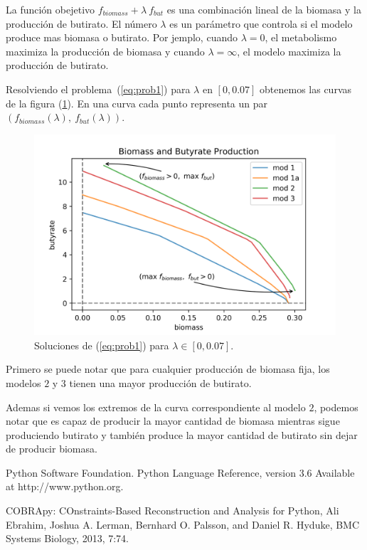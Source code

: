 \documentclass[12pt,spanish]{article}
\begin{document}
La función obejetivo $f_{biomass} +  \lambda \ f_{but}$  es una combinación lineal de la biomasa y la producción de butirato. El número $\lambda$ es un parámetro que controla si el modelo produce mas biomasa o butirato. Por jemplo, cuando $\lambda = 0$, el metabolismo maximiza la producción de biomasa y cuando $\lambda = \infty $, el modelo maximiza la producción de butirato.

\par

Resolviendo el problema~(\ref{eq:prob1}) para $\lambda$ en $[0, 0.07]$ obtenemos las curvas de la figura (\ref{fig:paretoCurve}). En una curva cada punto representa un par $(f_{biomass}(\lambda), \ f_{but}(\lambda))$.


\begin{figure}[h]\label{fig:paretoCurve}
  \includegraphics{../plots/lambdaAllModelsAnn.png}
  \caption{Soluciones de (\ref{eq:prob1}) para $\lambda \in [0, 0.07]$.}
\end{figure}

Primero se puede notar que para cualquier producción de biomasa fija, los modelos $2$ y $3$ tienen una mayor producción de butirato.

Ademas si vemos los extremos de la curva correspondiente al modelo $2$, podemos notar que es capaz de producir la mayor cantidad de biomasa mientras sigue produciendo butirato y también produce la mayor cantidad de butirato sin dejar de producir biomasa.





\begin{thebibliography}{1}

 Python Software Foundation. Python Language Reference, version 3.6 Available at http://www.python.org.

 COBRApy: COnstraints-Based Reconstruction and Analysis for Python,
Ali Ebrahim, Joshua A. Lerman, Bernhard O. Palsson, and Daniel R. Hyduke,
BMC Systems Biology, 2013, 7:74.

\end{thebibliography}
\end{document}
